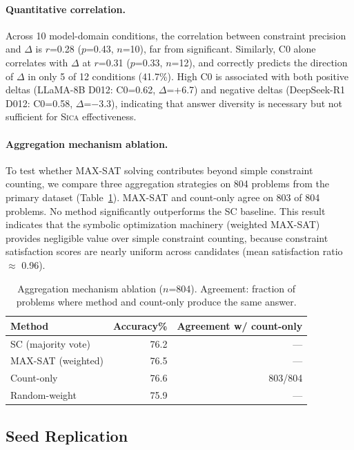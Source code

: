 \documentclass[11pt,a4paper]{article}
\newcommand{\sica}{\textsc{Sica}}
\newcommand{\pp}{\text{pp}}
\begin{document}
\paragraph{Quantitative correlation.}
Across 10 model-domain conditions, the correlation between constraint precision and $\Delta$ is $r$=0.28 ($p$=0.43, $n$=10), far from significant.
Similarly, C0 alone correlates with $\Delta$ at $r$=0.31 ($p$=0.33, $n$=12), and correctly predicts the direction of $\Delta$ in only 5 of 12 conditions (41.7\%).
High C0 is associated with both positive deltas (LLaMA-8B D012: C0=0.62, $\Delta$=+6.7\pp{}) and negative deltas (DeepSeek-R1 D012: C0=0.58, $\Delta$=$-$3.3\pp{}), indicating that answer diversity is necessary but not sufficient for \sica{} effectiveness.

\paragraph{Aggregation mechanism ablation.}
To test whether MAX-SAT solving contributes beyond simple constraint counting, we compare three aggregation strategies on 804 problems from the primary dataset (Table~\ref{tab:ablation}).
MAX-SAT and count-only agree on 803 of 804 problems.
No method significantly outperforms the SC baseline.
This result indicates that the symbolic optimization machinery (weighted MAX-SAT) provides negligible value over simple constraint counting, because constraint satisfaction scores are nearly uniform across candidates (mean satisfaction ratio $\approx$ 0.96).

\begin{table}[t]
\centering
\caption{Aggregation mechanism ablation ($n$=804). Agreement: fraction of problems where method and count-only produce the same answer.}
\label{tab:ablation}
\small
\begin{tabular}{lrr}
\toprule
Method & Accuracy\% & Agreement w/ count-only \\
\midrule
SC (majority vote) & 76.2 & --- \\
MAX-SAT (weighted) & 76.5 & --- \\
Count-only & 76.6 & 803/804 \\
Random-weight & 75.9 & --- \\
\bottomrule
\end{tabular}
\end{table}

\subsection{Seed Replication}
\end{document}
